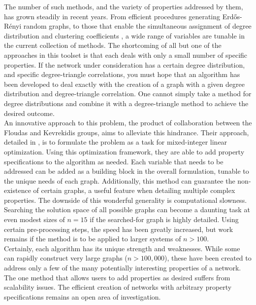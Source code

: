 \documentclass[11pt]{article}
\begin{document}
The number of such methods, and the variety of properties addressed by them, has grown steadily in recent years. From efficient procedures generating Erd\H{o}s-R\'{e}nyi random graphs, to those that enable the simultaneous assignment of degree distribution and clustering coefficients \cite{efficentAlgsRG} \cite{the something somethig paper}, a wide range of variables are tunable in the current collection of methods. The shortcoming of all but one of the approaches in this toolset is that each deals with only a small number of specific properties. If the network under consideration has a certain degree distribution, and specific degree-triangle correlations, you must hope that an algorithm has been developed to deal exactly with the creation of a graph with a given degree distribution and degree-triangle correlation. One cannot simply take a method for degree distributions and combine it with a degree-triangle method to achieve the desired outcome. \vspace{1mm}\\
An innovative approach to this problem, the product of collaboration between the Floudas and Kevrekidis groups, aims to alleviate this hindrance. Their approach, detailed in \cite{karthiksOptim}, is to formulate the problem as a task for mixed-integer linear optimization. Using this optimization framework, they are able to add property specifications to the algorithm as needed. Each variable that needs to be addressed can be added as a building block in the overall formulation, tunable to the unique needs of each graph. Additionally, this method can guarantee the non-existence of certain graphs, a useful feature when detailing multiple complex properties. The downside of this wonderful generality is computational slowness. Searching the solution space of all possible graphs can become a daunting task at even modest sizes of $n=15$ if the searched-for graph is highly detailed. Using certain pre-processing steps, the speed has been greatly increased, but work remains if the method is to be applied to larger systems of $n>100$. \\
Certainly, each algorithm has its unique strength and weaknesses. While some can rapidly construct very large graphs ($n>100,000$), these have been created to address only a few of the many potentially interesting properties of a network. The one method that allows users to add properties as desired suffers from scalability issues. The efficient creation of networks with arbitrary property specifications remains an open area of investigation.
\end{document}
